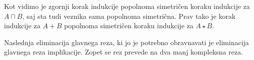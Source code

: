 \begin{prooftree}


\end{prooftree}
\dol
\begin{prooftree}
\end{prooftree}
Kot vidimo je zgornji korak indukcije popolnoma simetričen koraku indukcije za $A \sqcap B$, saj sta tudi veznika sama popolnoma simetrična. Prav tako je korak indukcije za $A+B$ popolnoma simetričen koraku indukcije za $A \star B$.
\begin{prooftree}


\end{prooftree}
\dol
\begin{prooftree}

\end{prooftree}
Naslednja eliminacija glavnega reza, ki jo je potrebno obravnavati je eliminacija glavnega reza implikacije. Zopet se rez prevede na dva manj kompleksna reza.
\begin{prooftree}


\end{prooftree}
